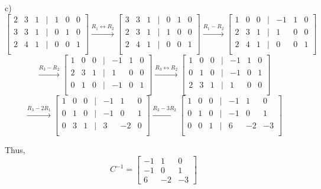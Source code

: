  \begin{solution}
     c) \[
 \begin{bmatrix}
     2 & 3 & 1 & | & 1 & 0 & 0 \\
     3 & 3 & 1 & | & 0 & 1 & 0 \\
     2 & 4 & 1 & | & 0 & 0 & 1 \\
 \end{bmatrix} \xrightarrow{R_1\leftrightarrow R_2} \begin{bmatrix}
     3 & 3 & 1 & | & 0 & 1 & 0 \\
     2 & 3 & 1 & | & 1 & 0 & 0 \\
     2 & 4 & 1 & | & 0 & 0 & 1 \\
 \end{bmatrix} \xrightarrow{R_1- R_2}
 \begin{bmatrix}
     1 & 0 & 0 & | & -1 & 1 & 0 \\
     2 & 3 & 1 & | & 1 & 0 & 0 \\
     2 & 4 & 1 & | & 0 & 0 & 1 \\
 \end{bmatrix}
 \]
 \[
 \xrightarrow{R_3- R_2}\begin{bmatrix}
     1 & 0 & 0 & | & -1 & 1 & 0 \\
     2 & 3 & 1 & | & 1 & 0 & 0 \\
     0 & 1 & 0 & | & -1 & 0 & 1 \\
 \end{bmatrix}\xrightarrow{R_3 \leftrightarrow R_2}
 \begin{bmatrix}
     1 & 0 & 0 & | & -1 & 1 & 0 \\  
     0 & 1 & 0 & | & -1 & 0 & 1 \\
     2 & 3 & 1 & | & 1 & 0 & 0 \\
    
 \end{bmatrix}\]\[\xrightarrow{R_3 -2 R_1}
 \begin{bmatrix}
     1 & 0 & 0 & | & -1 & 1 & 0 \\  
     0 & 1 & 0 & | & -1 & 0 & 1 \\
     0 & 3 & 1 & | & 3 & -2 & 0 \\    
 \end{bmatrix}\xrightarrow{R_3 -3 R_2}
 \begin{bmatrix}
     1 & 0 & 0 & | & -1 & 1 & 0 \\  
     0 & 1 & 0 & | & -1 & 0 & 1 \\
     0 & 0 & 1 & | & 6 & -2 & -3 \\    
 \end{bmatrix}%
 \]

 Thus,
 \[ C^{-1} = \begin{bmatrix} -1 & 1 & 0 \\ -1 & 0 & 1 \\ 6 &-2 & -3 \end{bmatrix} \]

 \end{solution}

